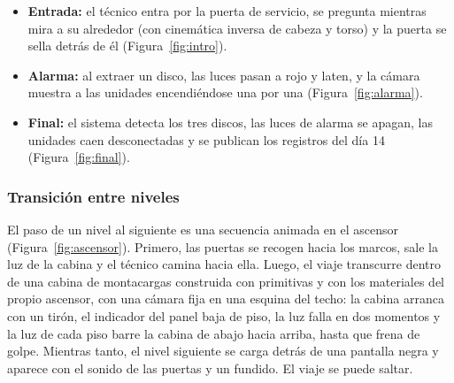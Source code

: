 \begin{itemize}
  \item \textbf{Entrada:} el técnico entra por la puerta de servicio, se pregunta  mientras mira a su alrededor (con cinemática inversa de cabeza y torso) y
        la puerta se sella detrás de él (Figura~\ref{fig:intro}).
  \item \textbf{Alarma:} al extraer un disco, las luces pasan a rojo y laten, y la cámara muestra a
        las unidades encendiéndose una por una (Figura~\ref{fig:alarma}).
  \item \textbf{Final:} el sistema detecta los tres discos, las luces de alarma se apagan, las
        unidades caen desconectadas y se publican los registros del día 14
        (Figura~\ref{fig:final}).
\end{itemize}




\subsubsection{Transición entre niveles}

El paso de un nivel al siguiente es una secuencia animada en el ascensor (Figura~\ref{fig:ascensor}).
Primero, las puertas se recogen hacia los marcos, sale la luz de la cabina y el técnico camina
hacia ella. Luego, el viaje transcurre dentro de una cabina de montacargas construida con primitivas
y con los materiales del propio ascensor, con una cámara fija en una esquina del techo: la cabina
arranca con un tirón, el indicador del panel baja de piso, la luz falla en dos momentos y la luz de
cada piso barre la cabina de abajo hacia arriba, hasta que frena de golpe. Mientras tanto, el nivel
siguiente se carga detrás de una pantalla negra y aparece con el sonido de las puertas y un
fundido. El viaje se puede saltar.


